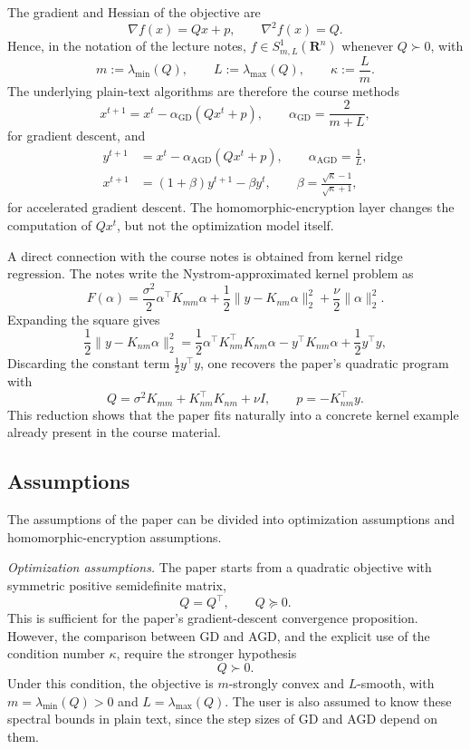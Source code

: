 \documentclass[10pt,english]{article}
\newcommand{\reals}{\mathbf{R}}
\begin{document}
The gradient and Hessian of the objective are
\[
\nabla f(x)=Qx+p,
\qquad
\nabla^2 f(x)=Q.
\]
Hence, in the notation of the lecture notes, $f \in S^1_{m,L}(\reals^n)$ whenever $Q \succ 0$, with
\[
m:=\lambda_{\min}(Q), \qquad L:=\lambda_{\max}(Q), \qquad \kappa:=\frac{L}{m}.
\]
The underlying plain-text algorithms are therefore the course methods
\[
x^{t+1}=x^t-\alpha_{\mathrm{GD}}(Qx^t+p),
\qquad
\alpha_{\mathrm{GD}}=\frac{2}{m+L},
\]
for gradient descent, and
\[
\begin{aligned}
y^{t+1}&=x^t-\alpha_{\mathrm{AGD}}(Qx^t+p), \qquad \alpha_{\mathrm{AGD}}=\frac{1}{L},\\
x^{t+1}&=(1+\beta)y^{t+1}-\beta y^t, \qquad \beta=\frac{\sqrt{\kappa}-1}{\sqrt{\kappa}+1},
\end{aligned}
\]
for accelerated gradient descent. The homomorphic-encryption layer changes the computation of $Qx^t$, but not the optimization model itself.

A direct connection with the course notes is obtained from kernel ridge regression. The notes write the Nystrom-approximated kernel problem as
\[
F(\alpha)=\frac{\sigma^2}{2}\alpha^\top K_{mm}\alpha+\frac{1}{2}\|y-K_{nm}\alpha\|_2^2+\frac{\nu}{2}\|\alpha\|_2^2.
\]
Expanding the square gives
\[
\frac{1}{2}\|y-K_{nm}\alpha\|_2^2
=
\frac{1}{2}\alpha^\top K_{nm}^\top K_{nm}\alpha
-y^\top K_{nm}\alpha
+\frac{1}{2}y^\top y,
\]
Discarding the constant term $\frac{1}{2}y^\top y$, one recovers the paper's quadratic program with
\[
Q=\sigma^2K_{mm}+K_{nm}^\top K_{nm}+\nu I,
\qquad
p=-K_{nm}^\top y.
\]
This reduction shows that the paper fits naturally into a concrete kernel example already present in the course material.

\subsection{Assumptions}

The assumptions of the paper can be divided into optimization assumptions and homomorphic-encryption assumptions.

\textit{Optimization assumptions.} The paper starts from a quadratic objective with symmetric positive semidefinite matrix,
\[
Q=Q^\top, \qquad Q \succeq 0.
\]
This is sufficient for the paper's gradient-descent convergence proposition. However, the comparison between GD and AGD, and the explicit use of the condition number $\kappa$, require the stronger hypothesis
\[
Q \succ 0.
\]
Under this condition, the objective is $m$-strongly convex and $L$-smooth, with $m=\lambda_{\min}(Q)>0$ and $L=\lambda_{\max}(Q)$. The user is also assumed to know these spectral bounds in plain text, since the step sizes of GD and AGD depend on them.
\end{document}
